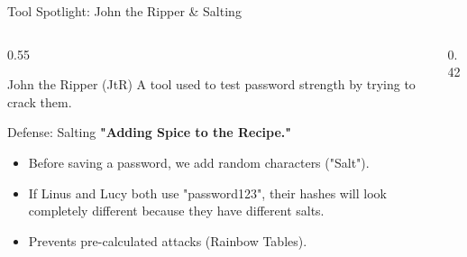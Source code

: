 \documentclass[aspectratio=169]{beamer}  %
\begin{document}
\begin{frame}{Tool Spotlight: John the Ripper \& Salting}
    \begin{columns}[T]
        \begin{column}{0.55\textwidth}
            \begin{block}{John the Ripper (JtR)}
                \footnotesize
                A tool used to test password strength by trying to crack them.
            \end{block}
            \begin{alertblock}{Defense: Salting}
                \footnotesize
                \textbf{"Adding Spice to the Recipe."}
                \begin{itemize}
                    \item Before saving a password, we add random characters ("Salt").
                    \item If Linus and Lucy both use "password123", their hashes will look completely different because they have different salts.
                    \item Prevents pre-calculated attacks (Rainbow Tables).
                \end{itemize}
            \end{alertblock}
        \end{column}
        \begin{column}{0.42\textwidth}
            \begin{center}
            \end{center}
        \end{column}
    \end{columns}
\end{frame}
\end{document}

